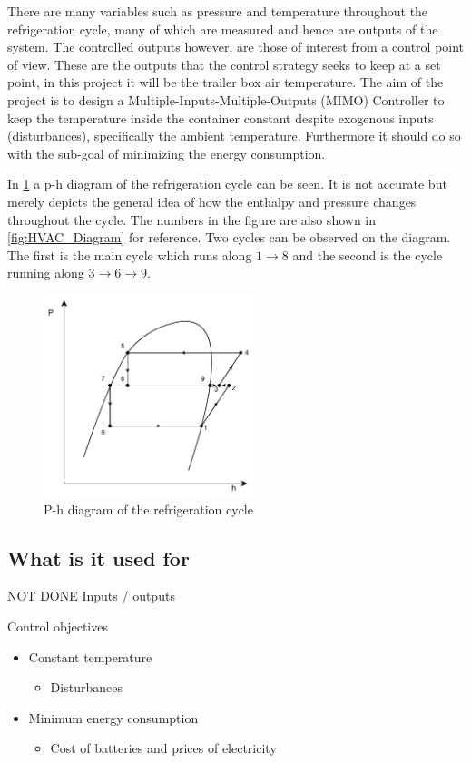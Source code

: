 There are many variables such as pressure and temperature throughout the refrigeration cycle, many of which are measured and hence are outputs of the system. 
The controlled outputs however, are those of interest from a control point of view. These are the outputs that the control strategy seeks to keep at a set point, in this project it will be the trailer box air temperature. The aim of the project is to design a Multiple-Inputs-Multiple-Outputs (MIMO) Controller to keep the temperature inside the container constant despite exogenous inputs (disturbances), specifically the ambient temperature. Furthermore it should do so with the sub-goal of minimizing the energy consumption.


In \cref{fig:p-h_diagram} a p-h diagram of the refrigeration cycle can be seen. It is not accurate but merely depicts the general idea of how the enthalpy and pressure changes throughout the cycle. The numbers in the figure are also shown in \cref{fig:HVAC_Diagram} for reference. Two cycles can be observed on the diagram. The first is the main cycle which runs along $1 \rightarrow 8$ and the second is the cycle running along $3\rightarrow 6 \rightarrow 9$.

\begin{figure}[h!]
	\centering
	\includegraphics[width=0.55\textwidth]{Graphics/Flash_Tank_P-h_Diagram}
	\caption{P-h diagram of the refrigeration cycle}
	\label{fig:p-h_diagram}
\end{figure}




\subsection{What is it used for}


	
NOT DONE
Inputs / outputs

Control objectives
\begin{itemize}
	\item Constant temperature
		\begin{itemize}
			\item Disturbances
		\end{itemize}
	\item Minimum energy consumption
		\begin{itemize}
			\item Cost of batteries and prices of electricity
		\end{itemize}
\end{itemize}

		
